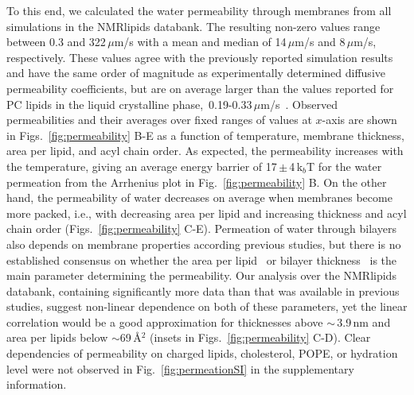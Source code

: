 \documentclass[fleqn,10pt]{wlscirep}
\begin{document}
To this end, we calculated the water permeability through membranes from all simulations in the NMRlipids databank. The resulting non-zero values range between 0.3 and 322\,$\mu$m/s with a mean and median of 14\,$\mu$m/s and 8\,$\mu$m/s, respectively. These values agree with the previously reported simulation results~\cite{venable19,camilo2022} and have the same order of magnitude as experimentally determined diffusive permeability coefficients, but are on average larger than the values reported for PC lipids in the liquid crystalline phase,~0.19-0.33\,$\mu$m/s~\cite{jansen95}. Observed permeabilities and their averages over fixed ranges of values at $x$-axis are shown in Figs.~\ref{fig:permeability} B-E as a function of temperature, membrane thickness, area per lipid, and acyl chain order.  
As expected, the permeability increases with the temperature, giving an average energy barrier of 17\,$\pm$\,4\,k$_b$T for the water permeation from the Arrhenius plot in Fig.~\ref{fig:permeability} B. On the other hand, the permeability of water decreases on average when membranes become more packed, i.e., with decreasing area per lipid and increasing thickness and acyl chain order (Figs.~\ref{fig:permeability} C-E). Permeation of water through bilayers also depends on membrane properties according previous studies, but there is no established consensus on whether the area per lipid~\cite{nagle08} or bilayer thickness~\cite{frallicciardi22} is the main parameter determining the permeability. 
Our analysis over the NMRlipids databank, containing significantly more data than that was available in previous studies, suggest non-linear dependence on both of these parameters, yet the linear correlation would be a good approximation for thicknesses above $\sim$\,3.9\,nm and area per lipids below $\sim$69\,Å$^2$ (insets in Figs.~\ref{fig:permeability} C-D).
Clear dependencies of permeability on charged lipids, cholesterol, POPE, or hydration level were not observed in Fig.~\ref{fig:permeationSI} in the supplementary information.
%
%
%
\end{document}
